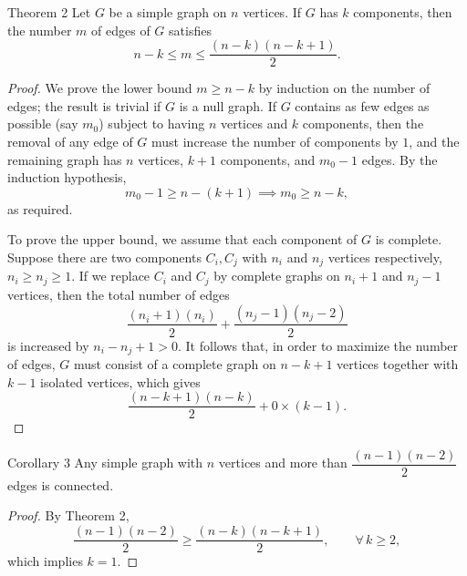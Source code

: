 \documentclass[11pt]{scrartcl}
\theoremstyle{plain}
\theoremstyle{remark}
\begin{document}
\begin{thmbox}{Theorem 2}
Let $G$ be a simple graph on $n$ vertices. If $G$ has $k$ components, then the number $m$ of edges of $G$ satisfies
$$n - k \leq m \leq \frac{(n-k)(n-k+1)}{2}.$$
\end{thmbox}

\begin{proof}
We prove the lower bound $m \geq n-k$ by induction on the number of edges; the result is trivial if $G$ is a null graph. If $G$ contains as few edges as possible (say $m_0$) subject to having $n$ vertices and $k$ components, then the removal of any edge of $G$ must increase the number of components by $1$, and the remaining graph has $n$ vertices, $k+1$ components, and $m_0 - 1$ edges. By the induction hypothesis,
$$m_0 - 1 \geq n - (k+1) \implies m_0 \geq n-k,$$
as required.

\medskip
\noindent To prove the upper bound, we assume that each component of $G$ is complete. Suppose there are two components $C_i, C_j$ with $n_i$ and $n_j$ vertices respectively, $n_i \geq n_j \geq 1$. If we replace $C_i$ and $C_j$ by complete graphs on $n_i+1$ and $n_j-1$ vertices, then the total number of edges
$$\frac{(n_i+1)(n_i)}{2} + \frac{(n_j-1)(n_j-2)}{2}$$
is increased by $n_i - n_j + 1 > 0$. It follows that, in order to maximize the number of edges, $G$ must consist of a complete graph on $n-k+1$ vertices together with $k-1$ isolated vertices, which gives
$$\frac{(n-k+1)(n-k)}{2} + 0 \times (k-1).$$
\end{proof}

\begin{thmbox}{Corollary 3}
Any simple graph with $n$ vertices and more than $\dfrac{(n-1)(n-2)}{2}$ edges is connected.
\end{thmbox}

\begin{proof}
By Theorem 2,
$$\frac{(n-1)(n-2)}{2} \geq \frac{(n-k)(n-k+1)}{2}, \qquad \forall\, k \geq 2,$$
which implies $k = 1$.
\end{proof}
\end{document}
